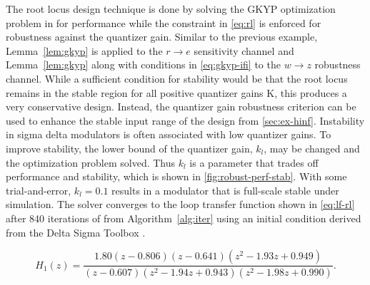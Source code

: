 The root locus design technique is done by solving the \gls{GKYP} optimization problem in for performance while the constraint in \autoref{eq:rl} is enforced for robustness against the quantizer gain. Similar to the previous example, Lemma~\ref{lem:gkyp} is applied to the $r \rightarrow e$ sensitivity channel and Lemma~\ref{lem:gkyp} along with conditions in \autoref{eq:gkyp-ifi} to the $w \rightarrow z$ robustness channel. While a sufficient condition for stability would be that the root locus remains in the stable region for all positive quantizer gains \gls{K}, this produces a very conservative design. Instead, the quantizer gain robustness criterion can be used to enhance the stable input range of the design from \autoref{sec:ex-hinf}. Instability in sigma delta modulators is often associated with low quantizer gains. To improve stability, the lower bound of the quantizer gain, $k_l$, may be changed and the optimization problem solved. Thus $k_l$ is a parameter that trades off performance and stability, which is shown in \autoref{fig:robust-perf-stab}. With some trial-and-error, $k_l=0.1$ results in a modulator that is full-scale stable under simulation. The solver converges to the loop transfer function shown in \autoref{eq:lf-rl} after 840 iterations of  from Algorithm~\ref{alg:iter} using an initial condition derived from the Delta Sigma Toolbox \cite[Appx. B]{Schreier1997}.

\begin{equation} \label{eq:lf-rl}
	H_1(z) = \frac{1.80\left(z - 0.806\right)\left(z - 0.641\right)\left(z^2 - 1.93z + 0.949\right)}{\left(z - 0.607\right)\left(z^2 - 1.94z + 0.943\right)\left(z^2 - 1.98z + 0.990\right)}.
\end{equation}

